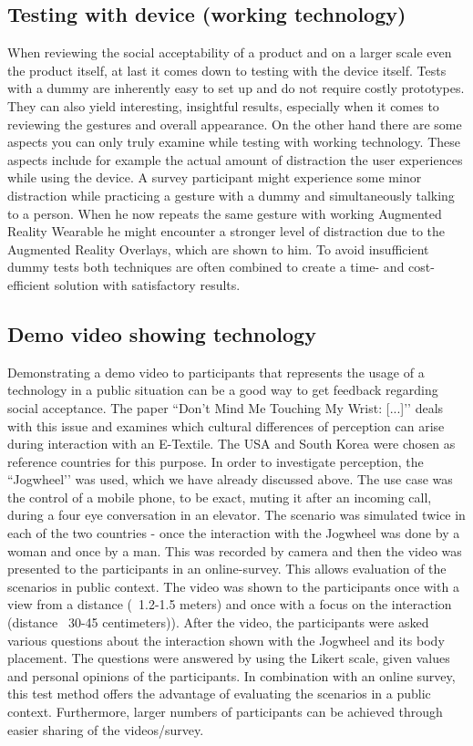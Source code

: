 \documentclass{sigchi}
\begin{document}
\subsection{Testing with device (working technology)}
When reviewing the social acceptability of a product and on a larger scale even the product itself, at last it comes down to testing with the device itself. Tests with a dummy are inherently easy to set up and do not require costly prototypes. They can also yield interesting, insightful results, especially when it comes to reviewing the gestures and overall appearance. On the other hand there are some aspects you can only truly examine while testing with working technology. These aspects include for example the actual amount of distraction the user experiences while using the device. A survey participant might experience some minor distraction while practicing a gesture with a dummy and simultaneously talking to a person. When he now repeats the same gesture with working Augmented Reality Wearable he might encounter a stronger level of distraction due to the Augmented Reality Overlays, which are shown to him.
To avoid insufficient dummy tests both techniques are often combined to create a time- and cost-efficient solution with satisfactory results.

\subsection{Demo video showing technology}
Demonstrating a demo video to participants that represents the usage of a technology in a public situation can be a good way to get feedback regarding social acceptance. The paper ``Don't Mind Me Touching My Wrist: [...]’’\cite{touch-wrist} deals with this issue and examines which cultural differences of perception can arise during interaction with an E-Textile. \cite{touch-wrist} The USA and South Korea were chosen as reference countries for this purpose. In order to investigate perception, the ``Jogwheel’’ was used, which we have already discussed above. The use case was the control of a mobile phone, to be exact, muting it after an incoming call, during a four eye conversation in an elevator. The scenario was simulated twice in each of the two countries - once the interaction with the Jogwheel was done by a woman and once by a man. This was recorded by camera and then the video was presented to the participants in an online-survey. This allows evaluation of the scenarios in public context. The video was shown to the participants once with a view from a distance (~1.2-1.5 meters) and once with a focus on the interaction (distance ~30-45 centimeters)). After the video, the participants were asked various questions about the interaction shown with the Jogwheel and its body placement. The questions were answered by using the Likert scale, given values and personal opinions of the participants. \cite{touch-wrist} In combination with an online survey, this test method offers the advantage of evaluating the scenarios in a public context. Furthermore, larger numbers of participants can be achieved through easier sharing of the videos/survey. \cite{touch-wrist}
\end{document}
